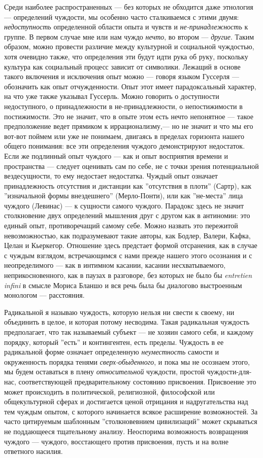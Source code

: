 \documentclass[12pt]{book}
\begin{document}
Среди наиболее распространенных --- без которых не обходится даже этнология --- определений чуждости, мы особенно часто сталкиваемся с этими двумя: \textit{недоступность} определенной области опыта и чувств и \textit{не-принадлежность} к группе. В первом случае мне или нам чуждо \textit{нечто}, во втором --- \textit{другие}. Таким образом, можно провести различие между культурной и социальной чуждостью, хотя очевидно также, что определения эти будут идти рука об руку, поскольку культура как социальный процесс зависит от символики. Лежащий в основе такого включения и исключения опыт можно --- говоря языком Гуссерля --- обозначить как опыт отчужденности. Опыт этот имеет парадоксальный характер, на что уже также указывал Гуссерль. Можно говорить о доступности недоступного, о принадлежности в не-принадлежности, о непостижимости в постижимости. Это не значит, что в опыте этом есть нечто непонятное --- такое предположение ведет прямиком к иррационализму,--- но не значит и что мы его вот-вот поймем или уже не понимаем, двигаясь в пределах горизонта нашего общего понимания: все эти определения чуждого демонстрируют недостаток. Если же подлинный опыт чуждого --- как и опыт восприятия времени и пространства --- следует оценивать сам по себе, не с точки зрения потенциальной вездесущности, то ему недостает недостатка. Чуждый опыт означает принадлежность отсутствия и дистанции как ''отсутствия в плоти'' (Сартр), как ''изначальной формы внездешнего'' (Мерло-Понти), или как ''не-места'' лица чуждого (Левинас) --- к сущности самого чуждого. Парадокс здесь не значит столкновение двух определений мышления друг с другом как в антиномии: это единый опыт, противоречащий самому себе. Можно назвать это пережитой невозможностью, как подразумевают такие авторы, как Бодлер, Валери, Кафка, Целан и Кьеркегор. Отношение здесь предстает формой отсранения, как в случае с чуждым взглядом, встречающимся с нами прежде нашего этого осознания и с неопределимого --- как в интимном касании, касании несхватываемого, неприкосновенного, как в паузах в разговоре, без которых не было бы \textit{entretien infini} в смысле Мориса Бланшо и вся речь была бы диалогово выстроенным монологом --- расстояния.

Радикальной я называю чуждость, которую нельзя ни свести к своему, ни объединить в целое, и которая потому несводима. Такая радикальная чуждость предполагает, что так называемый субъект --- не хозяин самого себя, и каждому порядку, который ''есть'' и контингентен, есть пределы. Чуждость в ее радикальной форме означает определенную \textit{неуместность} самости и окруженность порядка тенями \textit{сверх-обыденного}, и пока мы не осознаем этого, мы будем оставаться в плену \textit{относительной} чуждости, простой чуждости-для-нас, соответствующей предварительному состоянию присвоения. Присвоение это может происходить в политической, религиозной, философской или общекультурной сферах и достигается ценой отрицания и надругательства над тем чуждым опытом, с которого начинается всякое расширение возможностей. За часто цитируемым шаблонным ''столкновевнием цивилизаций'' может скрываться не поддающееся тщательному анализу. Неоспорима возможность возвращения чуждого --- чуждого, восстающего против присвоения, пусть и на волне ответного насилия.
\end{document}
